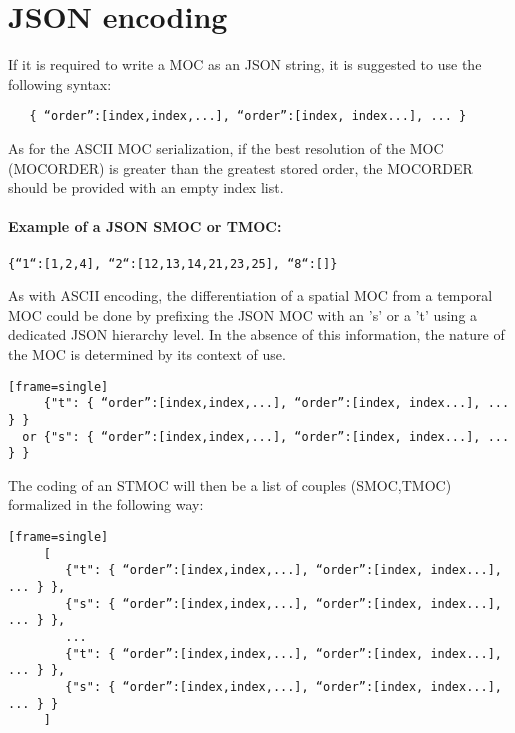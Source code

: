 \section{JSON encoding}
If it is required to write a MOC as an JSON string,
it is suggested to use the following syntax:

\par\noindent
\begin{verbatim}
   { “order”:[index,index,...], “order”:[index, index...], ... }
\end{verbatim}

As for the ASCII MOC serialization, if the best resolution
of the MOC (MOCORDER) is greater than the greatest stored order, the
MOCORDER should be provided with an empty index list.

\paragraph{Example of a JSON SMOC or TMOC:}
\par\noindent
\begin{Verbatim}[frame=single]
    {“1“:[1,2,4], “2“:[12,13,14,21,23,25], “8“:[]}
\end{Verbatim}

As with ASCII encoding, the differentiation of a spatial MOC from a temporal MOC could be done by prefixing the JSON MOC with an 's' or a 't' using a dedicated JSON hierarchy level. In the absence of this information, the nature of the MOC is determined by its context of use.

\par\noindent
\begin{verbatim}[frame=single]
     {"t": { “order”:[index,index,...], “order”:[index, index...], ... } }
  or {"s": { “order”:[index,index,...], “order”:[index, index...], ... } }
\end{verbatim}


The coding of an STMOC will then be a list of couples (SMOC,TMOC) formalized in the following way:
\par\noindent
\begin{verbatim}[frame=single]
     [
        {"t": { “order”:[index,index,...], “order”:[index, index...], ... } },
        {"s": { “order”:[index,index,...], “order”:[index, index...], ... } },
        ...
        {"t": { “order”:[index,index,...], “order”:[index, index...], ... } },
        {"s": { “order”:[index,index,...], “order”:[index, index...], ... } }
     ]
\end{verbatim}

